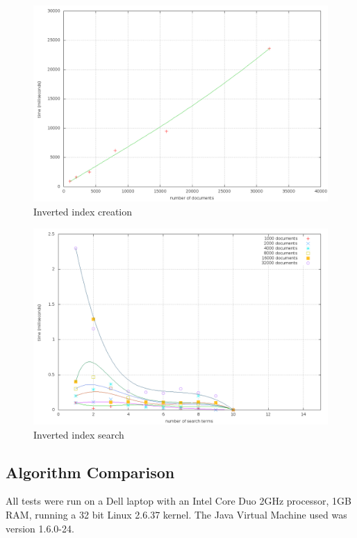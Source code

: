 \documentclass[10pt]{report}
\begin{document}
\begin{figure}
  \begin{center}
	\includegraphics[width=\textwidth,height=!]{invscan}
  \end{center}
  \caption{Inverted index creation}
  \label{fig:invscan}
\end{figure} 

\begin{figure}
  \begin{center}
	\includegraphics[width=\textwidth,height=!]{invsearch}
  \end{center}
  \caption{Inverted index search}
  \label{fig:invsearch}
\end{figure} 

\subsection*{Algorithm Comparison}
\label{sec:algorithmcomparison}
All tests were run on a Dell laptop with an Intel Core Duo 2GHz
processor, 1GB RAM, running a 32 bit Linux 2.6.37 kernel. The Java
Virtual Machine used was version 1.6.0-24. 






\end{document}
